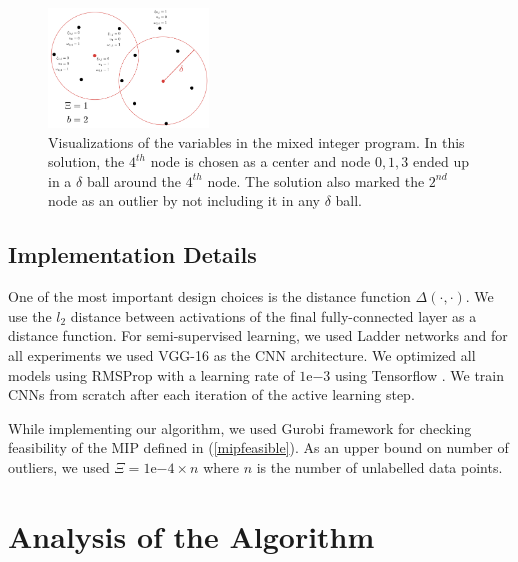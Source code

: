 \documentclass{article}
\begin{document}
\begin{figure}
\vspace{-5mm}
  \begin{center}
\includegraphics[width=0.38\textwidth]{mip.pdf}
\end{center}
    \caption{Visualizations of the variables in the mixed integer program. In this solution, the $4^{th}$ node is chosen as a center and node $0,1,3$ ended up in a $\delta$ ball around the $4^{th}$ node. The solution also marked the $2^{nd}$ node as an outlier by not including it in any $\delta$ ball.}
\label{mip}
\vspace{-12mm}
\end{figure}



\subsection{Implementation Details}
\label{sec:imp}
One of the most important design choices is the distance function $\Delta(\cdot,\cdot)$. We use the $l_2$ distance between activations of the final fully-connected layer as a distance function. For semi-supervised learning, we used Ladder networks \cite{ladder} and for all experiments we used VGG-16 \cite{vgg} as the CNN architecture. We optimized all models using RMSProp with a learning rate of $1\mathrm{e}{-3}$ using Tensorflow \cite{tensorflow}. We train CNNs from scratch after each iteration of the active learning step.

While implementing our algorithm, we used Gurobi \cite{gurobi} framework for checking feasibility of the MIP defined in (\ref{mipfeasible}). As an upper bound on number of outliers, we used $\Xi=1\mathrm{e}{-4} \times n$ where $n$ is the number of unlabelled data points.

\section{Analysis of the Algorithm}
\label{sec:analysis}

\end{document}
